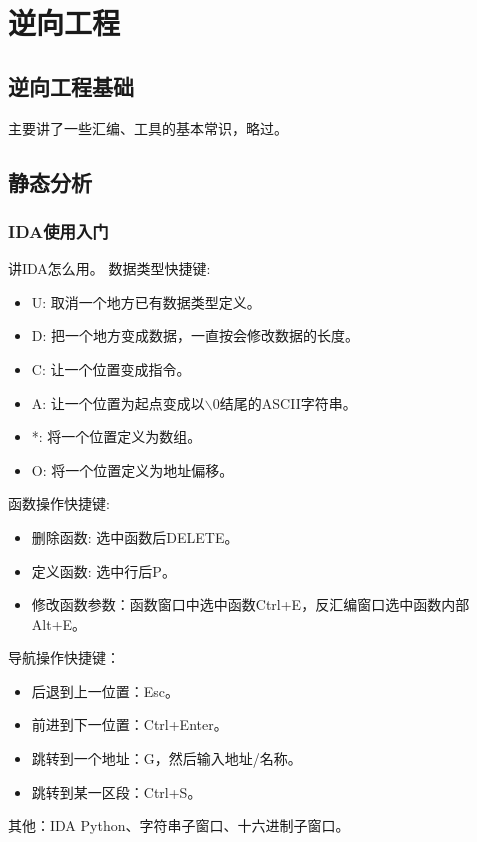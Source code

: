 \chapter{逆向工程}
\section{逆向工程基础}
主要讲了一些汇编、工具的基本常识，略过。


\section{静态分析}
\subsection{IDA使用入门}
讲IDA怎么用。
数据类型快捷键:
\begin{itemize}
    \item U: 取消一个地方已有数据类型定义。
    \item D: 把一个地方变成数据，一直按会修改数据的长度。
    \item C: 让一个位置变成指令。
    \item A: 让一个位置为起点变成以$\backslash 0$结尾的ASCII字符串。
    \item *: 将一个位置定义为数组。
    \item O: 将一个位置定义为地址偏移。
\end{itemize}

函数操作快捷键:
\begin{itemize}
    \item 删除函数: 选中函数后DELETE。
    \item 定义函数: 选中行后P。
    \item 修改函数参数：函数窗口中选中函数Ctrl+E，反汇编窗口选中函数内部Alt+E。
\end{itemize}

导航操作快捷键：
\begin{itemize}
    \item 后退到上一位置：Esc。
    \item 前进到下一位置：Ctrl+Enter。
    \item 跳转到一个地址：G，然后输入地址/名称。
    \item 跳转到某一区段：Ctrl+S。
\end{itemize}

其他：IDA Python、字符串子窗口、十六进制子窗口。

